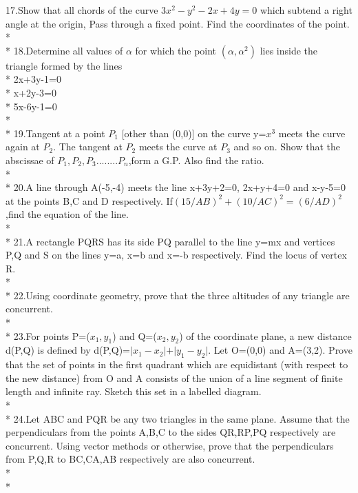 \documentclass{article}
\begin{document}
{17.\enspace Show that all chords of the curve $3x^2-y^2-2x+4y=0$ which subtend a right angle at the origin, Pass through a fixed point. Find the coordinates of the point.\\*\\*
18.\enspace Determine all values of $\alpha$ for which the point $(\alpha, \alpha^2)$ lies inside the triangle formed by the lines\\* 
\enspace2x+3y-1=0\\* x+2y-3=0 \\* 5x-6y-1=0\\*\\*
19.\enspace Tangent at a point $P_1$ [other than (0,0)] on the curve y=$x^3$ meets the curve again at $P_2$. The tangent at $P_2$ meets the curve at $P_3$ and so on. Show that the abscissae of $P_1,P_2,P_3........P_n$,form a G.P. Also find the ratio.\\*\\*
20.\enspace A line through A(-5,-4) meets the line x+3y+2=0, 2x+y+4=0 and x-y-5=0 at the points B,C and D respectively. If$(15/AB)^2+(10/AC)^2=(6/AD)^2$,find the equation of the line.\\*\\*
21.\enspace A rectangle PQRS has its side PQ parallel to the line y=mx and vertices P,Q and S on the lines y=a, x=b and x=-b respectively. Find the locus of vertex R.\\*\\*
22.\enspace Using coordinate geometry, prove that the three altitudes of any triangle are concurrent.\\*\\*
23.\enspace For points P=($x_1,y_1$) and Q=($x_2,y_2$) of the coordinate plane, a new distance d(P,Q) is defined by d(P,Q)=$\vert x_1-x_2\vert+ \vert y_1-y_2\vert$. Let O=(0,0) and A=(3,2). Prove that the set of points in the first quadrant which are equidistant (with respect to the new distance) from O and A consists of the union of a line segment of finite length and infinite ray. Sketch this set in a labelled diagram.\\*\\*
24.\enspace Let ABC and PQR be any two triangles in the same plane. Assume that the perpendiculars from the points A,B,C to the sides QR,RP,PQ respectively are concurrent. Using vector methods or otherwise, prove that the perpendiculars from P,Q,R to BC,CA,AB respectively are also concurrent.\\*\\*
}
\end{document}
